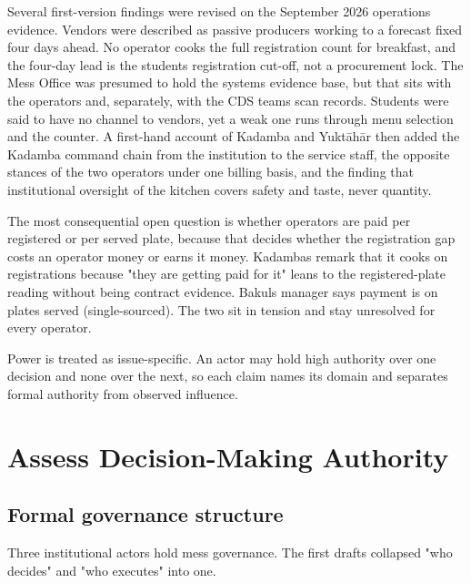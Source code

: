 \documentclass[
  10pt,
  table]{article}
\newcounter{none} %
\begin{document}
Several first-version findings were revised on the September 2026 operations evidence. Vendors were described as passive producers working to a forecast fixed four days ahead. No operator cooks the full registration count for breakfast, and the four-day lead is the students\textquotesingle{} registration cut-off, not a procurement lock. The Mess Office was presumed to hold the system\textquotesingle s evidence base, but that sits with the operators and, separately, with the CDS team\textquotesingle s scan records. Students were said to have no channel to vendors, yet a weak one runs through menu selection and the counter. A first-hand account of Kadamba and Yuktāhār then added the Kadamba command chain from the institution to the service staff, the opposite stances of the two operators under one billing basis, and the finding that institutional oversight of the kitchen covers safety and taste, never quantity.

The most consequential open question is whether operators are paid per registered or per served plate, because that decides whether the registration gap costs an operator money or earns it money. Kadamba\textquotesingle s remark that it cooks on registrations because "they are getting paid for it" leans to the registered-plate reading without being contract evidence. Bakul\textquotesingle s manager says payment is on plates served (single-sourced). The two sit in tension and stay unresolved for every operator.

Power is treated as issue-specific. An actor may hold high authority over one decision and none over the next, so each claim names its domain and separates formal authority from observed influence.

\section{Assess Decision-Making Authority}\label{assess-decision-making-authority}

\subsection{Formal governance structure}\label{formal-governance-structure}

Three institutional actors hold mess governance. The first drafts collapsed "who decides" and "who executes" into one.
\end{document}
